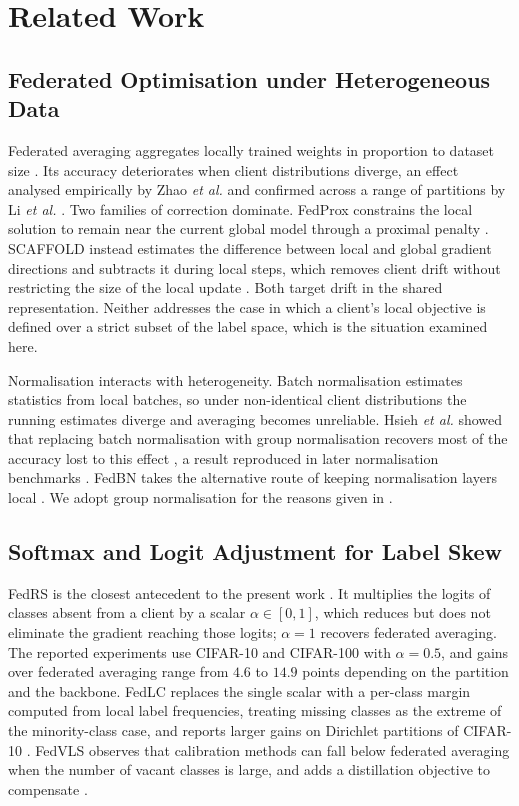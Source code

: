 \documentclass[journal]{IEEEtran}
\begin{document}
\section{Related Work}

\subsection{Federated Optimisation under Heterogeneous Data}
Federated averaging aggregates locally trained weights in proportion to dataset
size \cite{mcmahan2017}. Its accuracy deteriorates when client distributions
diverge, an effect analysed empirically by Zhao \emph{et al.} \cite{zhao2018}
and confirmed across a range of partitions by Li \emph{et al.} \cite{li2022exp}.
Two families of correction dominate. FedProx constrains the local solution to
remain near the current global model through a proximal penalty
\cite{fedprox2020}. SCAFFOLD instead estimates the difference between local and
global gradient directions and subtracts it during local steps, which removes
client drift without restricting the size of the local update
\cite{scaffold2020}. Both target drift in the shared representation. Neither
addresses the case in which a client's local objective is defined over a
strict subset of the label space, which is the situation examined here.

Normalisation interacts with heterogeneity. Batch normalisation estimates
statistics from local batches, so under non-identical client distributions the
running estimates diverge and averaging becomes unreliable. Hsieh \emph{et al.}
showed that replacing batch normalisation with group normalisation
\cite{groupnorm2018} recovers most of the accuracy lost to this effect
\cite{hsieh2020}, a result reproduced in later normalisation benchmarks
\cite{casella2023}. FedBN takes the alternative route of keeping normalisation
layers local \cite{fedbn2021}. We adopt group normalisation for the reasons
given in \cite{hsieh2020}.

\subsection{Softmax and Logit Adjustment for Label Skew}
FedRS is the closest antecedent to the present work \cite{fedrs2021}. It
multiplies the logits of classes absent from a client by a scalar
$\alpha \in [0,1]$, which reduces but does not eliminate the gradient reaching
those logits; $\alpha = 1$ recovers federated averaging. The reported
experiments use CIFAR-10 and CIFAR-100 with $\alpha = 0.5$, and gains over
federated averaging range from $4.6$ to $14.9$ points depending on the partition
and the backbone. FedLC replaces the single scalar with a per-class margin
computed from local label frequencies, treating missing classes as the extreme
of the minority-class case, and reports larger gains on Dirichlet partitions of
CIFAR-10 \cite{fedlc2022}. FedVLS observes that calibration methods can fall
below federated averaging when the number of vacant classes is large, and adds a
distillation objective to compensate \cite{fedvls2025}.
\end{document}
